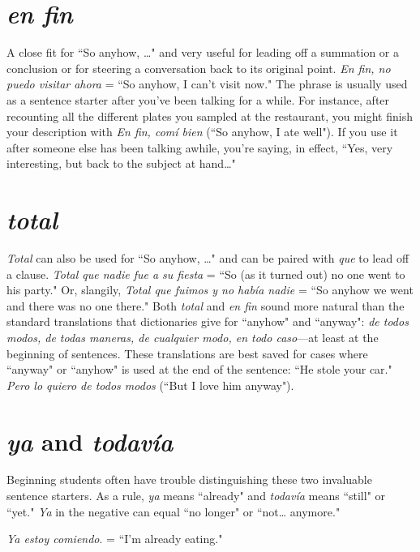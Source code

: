 \section{\emph{en fin}}

A close fit for ``So anyhow, \ldots{}" and very useful for leading off
a summation or a conclusion or for steering a conversation back to its
original point. \emph{En fin, no puedo visitar ahora} = ``So anyhow, I can't
visit now." The phrase is usually used as a sentence starter after you've
been talking for a while. For instance, after recounting all the different
plates you sampled at the restaurant, you might finish your description
with \emph{En fin, comí bien} (``So anyhow, I ate well"). If you use it after
someone else has been talking awhile, you're saying, in effect, ``Yes,
very interesting, but back to the subject at hand\ldots{}"

\section{\emph{total}}

\emph{Total} can also be used for ``So anyhow, \ldots{}" and can be paired
with \emph{que} to lead off a clause. \emph{Total que nadie fue a su fiesta} = ``So (as
it turned out) no one went to his party." Or, slangily, \emph{Total que fuimos
y no había nadie} = ``So anyhow we went and there was no one there."
Both \emph{total} and \emph{en fin} sound more natural than the standard translations that dictionaries give for ``anyhow" and ``anyway": \emph{de todos modos, de todas maneras, de cualquier modo, en todo caso}---at least at
the beginning of sentences. These translations are best saved for cases
where ``anyway" or ``anyhow" is used at the end of the sentence:
``He stole your car." \emph{Pero lo quiero de todos modos} (``But I love him
anyway").

\section{\emph{ya} and \emph{todavía}}

Beginning students often have trouble distinguishing these
two invaluable sentence starters. As a rule, \emph{ya} means ``already" and \emph{todavía} means ``still" or ``yet." \emph{Ya} in the negative can equal ``no longer"
or ``not\ldots{} anymore."

\bsk

\indu \emph{Ya estoy comiendo}. = ``I'm already eating."

